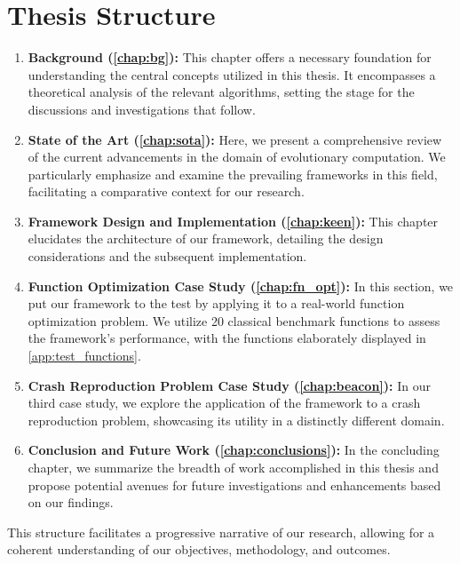\section{Thesis Structure}
\label{sec:structure}

  \begin{enumerate}
    \item \textbf{Background (\vref{chap:bg}):} This chapter offers a necessary foundation for understanding the 
      central concepts utilized in this thesis. It encompasses a theoretical analysis of the relevant algorithms, 
      setting the stage for the discussions and investigations that follow.
    \item \textbf{State of the Art (\vref{chap:sota}):} Here, we present a comprehensive review of the current 
      advancements in the domain of evolutionary computation. We particularly emphasize and examine the prevailing 
      frameworks in this field, facilitating a comparative context for our research.
    \item \textbf{Framework Design and Implementation (\vref{chap:keen}):} This chapter elucidates the architecture of 
      our framework, detailing the design considerations and the subsequent implementation.
    \item \textbf{Function Optimization Case Study (\vref{chap:fn_opt}):} In 
      this section, we put our framework to the test by applying it to a 
      real-world function optimization problem.
      We utilize 20 classical benchmark functions to assess the framework's 
      performance, with the functions elaborately displayed in 
      \vref{app:test_functions}.
    \item \textbf{Crash Reproduction Problem Case Study (\vref{chap:beacon}):} 
      In our third case study, we explore the application of the framework to a 
      crash reproduction problem, showcasing its utility in a distinctly 
      different domain.
    \item \textbf{Conclusion and Future Work (\vref{chap:conclusions}):} In the 
      concluding chapter, we summarize the breadth of work accomplished in this 
      thesis and propose potential avenues for future investigations and 
      enhancements based on our findings.
  \end{enumerate}

  This structure facilitates a progressive narrative of our research, allowing 
  for a coherent understanding of our objectives, methodology, and outcomes.
